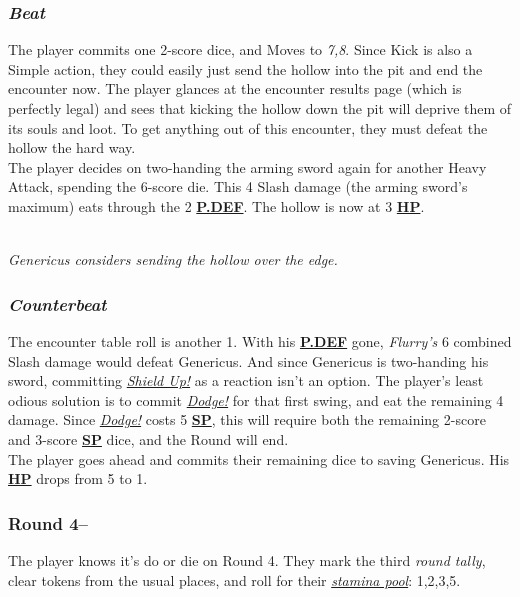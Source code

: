\documentclass[12pt]{article}
\newcommand{\refto}[1]{\hyperlink{#1}{\textbf{#1}}}
\newcommand{\reftoit}[1]{\hyperlink{#1}{\emph{#1}}}
\begin{document}
\begin{multicols*}{2}
\subsubsection*{\emph{Beat}}
The player commits one 2-score dice, and Moves to \emph{7,8}. Since Kick is also a Simple action, they could easily just send the hollow into the pit and end the encounter now. The player glances at the encounter results page (which is perfectly legal) and sees that kicking the hollow down the pit will deprive them of its souls and loot. To get anything out of this encounter, they must defeat the hollow the hard way.\\
The player decides on two-handing the arming sword again for another Heavy Attack, spending the 6-score die. This 4 Slash damage (the arming sword’s maximum) eats through the 2 \refto{P.DEF}. The hollow is now at 3 \refto{HP}.
\begin{center}
\\
\emph{Genericus considers sending the hollow over the edge.}
\end{center}
\subsubsection*{\emph{Counterbeat}}
The encounter table roll is another 1. With his \refto{P.DEF} gone, \emph{Flurry’s} 6 combined Slash damage would defeat Genericus. And since Genericus is two-handing his sword, committing \reftoit{Shield Up!} as a reaction isn’t an option. The player’s least odious solution is to commit \reftoit{Dodge!} for that first swing, and eat the remaining 4 damage. Since \reftoit{Dodge!} costs 5 \refto{SP}, this will require both the remaining 2-score and 3-score \refto{SP} dice, and the Round will end.\\
The player goes ahead and commits their remaining dice to saving Genericus. His \refto{HP} drops from 5 to 1.

\subsubsection*{Round 4--}
The player knows it’s do or die on Round 4. They mark the third \emph{round tally}, clear tokens from the usual places, and roll for their \reftoit{stamina pool}: 1,2,3,5.

\end{multicols*}
\end{document}
